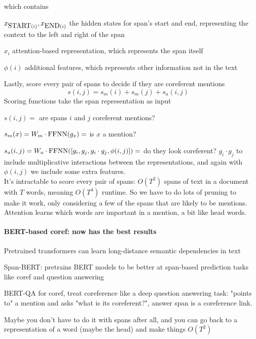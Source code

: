 \documentclass[10pt]{report}
\begin{document}
which contains
\begin{list}{}{}
	\item $x_{\hbox{START}(i)},x_{\hbox{END}(i)}$ the hidden states for span's start and end, representing the context to the left and right of the span
	\item $\hat{x}_i$ attention-based representation, which represents the span itself
	\item $\phi(i)$ additional features, which represents other information not in the text
\end{list}
Lastly, score every pair of spans to decide if they are coreferent mentions
$$s(i,j) = s_m(i) + s_m(j) + s_a(i,j)$$
Scoring functions take the span representation as input
\begin{list}{}{}
	\item $s(i,j)=$ are spans $i$ and $j$ coreferent mentions?
	\item $s_m(x)= W_m\cdot\hbox{FFNN}(g_x)=$ is $x$ a mention?
	\item $s_a(i,j)= W_a\cdot\hbox{FFNN}([g_i,g_j,g_i\cdot g_j, \phi(i,j)])=$ do they look coreferent? $g_i\cdot g_j$ to include multiplicative interactions between the representations, and again with $\phi(i,j)$ we include some extra features.\\
It's intractable to score every pair of spans: $O(T^2)$ spans of text in a document with $T$ words, meaning $O(T^4)$ runtime. So we have to do lots of pruning to make it work, only considering a few of the spans that are likely to be mentions. Attention learns which words are important in a mention, a bit like head words.
\end{list}
\paragraph{BERT-based coref: now has the best results} Pretrained transformers can learn long-distance semantic dependencies in text
\begin{list}{}{}
	\item Span-BERT: pretrains BERT models to be better at span-based prediction tasks like coref and question answering
	\item BERT-QA for coref, treat coreference like a deep question answering task: "points to" a mention and asks "what is its coreferent?", answer span is a coreference link.
	\item Maybe you don't have to do it with spans after all, and you can go back to a representation of a word (maybe the head) and make things $O(T^2)$
\end{list}
\end{document}
